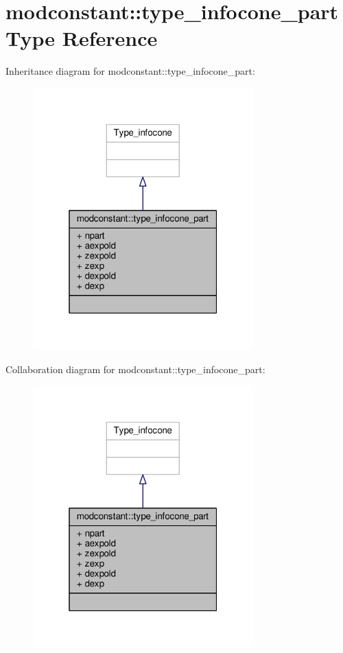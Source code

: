 \hypertarget{structmodconstant_1_1type__infocone__part}{}\section{modconstant\+:\+:type\+\_\+infocone\+\_\+part Type Reference}
\label{structmodconstant_1_1type__infocone__part}


Inheritance diagram for modconstant\+:\+:type\+\_\+infocone\+\_\+part\+:\nopagebreak
\begin{figure}[H]
\begin{center}
\leavevmode
\includegraphics[width=241pt]{structmodconstant_1_1type__infocone__part__inherit__graph}
\end{center}
\end{figure}


Collaboration diagram for modconstant\+:\+:type\+\_\+infocone\+\_\+part\+:\nopagebreak
\begin{figure}[H]
\begin{center}
\leavevmode
\includegraphics[width=241pt]{structmodconstant_1_1type__infocone__part__coll__graph}
\end{center}
\end{figure}
